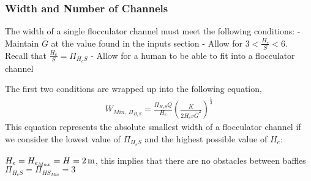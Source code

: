 \documentclass[letterpaper,10pt,english]{sphinxmanual}
\begin{document}
\subsubsection{Width and Number of Channels}
\label{\detokenize{Flocculation/Floc_Design:width-and-number-of-channels}}
The width of a single flocculator channel must meet the following conditions:
- Maintain \(\bar G\) at the value found in the inputs section
- Allow for \(3 < \frac{H_e}{S} < 6\). Recall that \(\frac{H_e}{S} =  \Pi_{H_eS}\)
- Allow for a human to be able to fit into a flocculator channel

The first two conditions are wrapped up into the following equation, {\hyperref[\detokenize{Flocculation/Floc_Derivations:title-flocculation-derivations}]{}}
\begin{equation}\label{equation:Flocculation/Floc_Design:Flocculation/Floc_Design:20}
\begin{split}W_{Min, \, \Pi_{H_eS}} = \frac{\Pi_{H_eS}Q}{H_e}\left( \frac{K}{2 H_e \nu \bar G^2} \right)^\frac{1}{3}\end{split}
\end{equation}
This equation represents the absolute smallest width of a flocculator channel if we consider the lowest value of \(\Pi_{H_eS}\) and the highest possible value of \(H_e\):

\(H_e = H_{e_{Max}} = H = 2 \, {\rm m}\), this implies that there are no obstacles between baffles
\(\Pi_{H_eS} = \Pi_{ {HS}_{Min} } = 3\)
\end{document}
